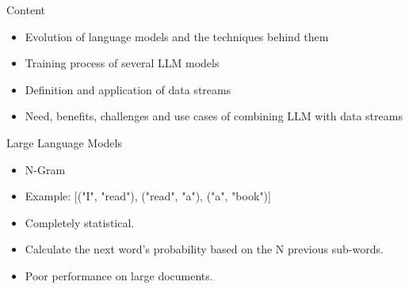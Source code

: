 \documentclass[t]{beamer}
\begin{document}
\begin{frame}{Content}
  \vspace{1cm}
  \begin{itemize}
    \item Evolution of language models and the techniques behind them
    \newline
    \item Training process of several LLM models
    \newline
    \item Definition and application of data streams
    \newline
    \item Need, benefits, challenges and use cases of combining LLM with data streams
  \end{itemize}
\end{frame}
\begin{frame}{Large Language Models}
  \vspace{3cm}
  \centering
\vspace{1cm}
\begin{itemize}
  \item N-Gram \cite{Cavnar94}
  \item Example: [("I", "read"), ("read", "a"), ("a", "book")]
  \item Completely statistical.
  \item Calculate the next word's probability based on the N previous sub-words.
  \item Poor performance on large documents.
\end{itemize}
\end{frame}
\end{document}
